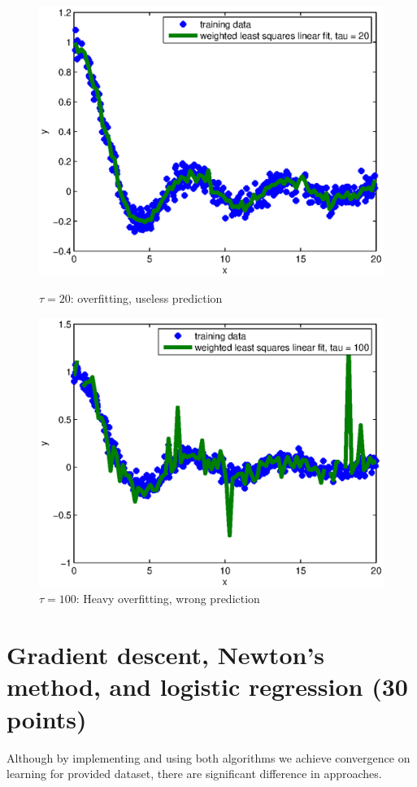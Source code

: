 \documentclass{article}
\begin{document}
	\begin{figure}
		\centering
		\begin{minipage}{.5\textwidth}
			\centering
			\includegraphics[width=.9\linewidth]{LWR-20.eps}
			\caption{$\tau = 20$: overfitting, useless prediction}
			\label{fig:sub1}
		\end{minipage}%
		\begin{minipage}{.5\textwidth}
			\centering
			\includegraphics[width=.9\linewidth]{LWR-100.eps}
			\caption{$\tau = 100$: Heavy overfitting, wrong prediction}
			\label{fig:sub1}
		\end{minipage}
	\end{figure}


\section{Gradient descent, Newton's method, and logistic regression (30	points)}
	Although by implementing and using both algorithms we achieve convergence on learning for provided dataset, there are significant difference in approaches. 
	
\end{document}
